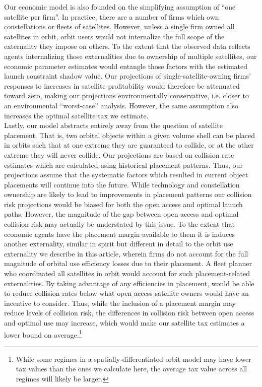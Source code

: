 \documentclass[12pt]{article}
\begin{document}
Our economic model is also founded on the simplifying assumption of ``one satellite per firm''. In practice, there are a number of firms which own constellations or fleets of satellites. However, unless a single firm owned all satellites in orbit, orbit users would not internalize the full scope of the externality they impose on others. To the extent that the observed data reflects agents internalizing those externalities due to ownership of multiple satellites, our economic parameter estimates would entangle those factors with the estimated launch constraint shadow value. Our projections of single-satellite-owning firms' responses to increases in satellite profitability would therefore be attenuated toward zero, making our projections environmentally conservative, i.e. closer to an environmental ``worst-case'' analysis. However, the same assumption also increases the optimal satellite tax we estimate. \\

Lastly, our model abstracts entirely away from the question of satellite placement. That is, two orbital objects within a given volume shell can be placed in orbits such that at one extreme they are guaranteed to collide, or at the other extreme they will never collide. Our projections are based on collision rate estimates which are calculated using historical placement patterns. Thus, our projections assume that the systematic factors which resulted in current object placements will continue into the future. While technology and constellation ownership are likely to lead to improvements in placement patterns our collision risk projections would be biased for both the open access and optimal launch paths. However, the magnitude of the gap between open access and optimal collision risk may actually be understated by this issue. To the extent that economic agents have the placement margin available to them it is induces another externality, similar in spirit but different in detail to the orbit use externality we describe in this article, wherein firms do not account for the full magnitude of orbital use efficiency losses due to their placement. A fleet planner who coordinated all satellites in orbit would account for such placement-related externalities. By taking advantage of any efficiencies in placement, would be able to reduce collision rates below what open access satellite owners would have an incentive to consider. Thus, while the inclusion of a placement margin may reduce levels of collision risk, the differences in collision risk between open access and optimal use may increase, which would make our satellite tax estimates a lower bound on average.\footnote{While some regimes in a spatially-differentiated orbit model may have lower tax values than the ones we calculate here, the average tax value across all regimes will likely be larger.}
\end{document}
